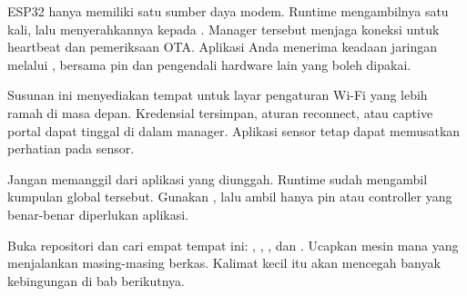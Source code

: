 ESP32 hanya memiliki satu sumber daya modem. Runtime mengambilnya satu kali, lalu menyerahkannya kepada . Manager tersebut menjaga koneksi untuk heartbeat dan pemeriksaan OTA. Aplikasi Anda menerima keadaan jaringan melalui , bersama pin dan pengendali hardware lain yang boleh dipakai.

Susunan ini menyediakan tempat untuk layar pengaturan Wi-Fi yang lebih ramah di masa depan. Kredensial tersimpan, aturan reconnect, atau captive portal dapat tinggal di dalam manager. Aplikasi sensor tetap dapat memusatkan perhatian pada sensor.

\begin{warningbox}
Jangan memanggil  dari aplikasi yang diunggah. Runtime sudah mengambil kumpulan global tersebut. Gunakan , lalu ambil hanya pin atau controller yang benar-benar diperlukan aplikasi.
\end{warningbox}

\begin{checkpoint}
Buka repositori dan cari empat tempat ini: , , , dan . Ucapkan mesin mana yang menjalankan masing-masing berkas. Kalimat kecil itu akan mencegah banyak kebingungan di bab berikutnya.
\end{checkpoint}
